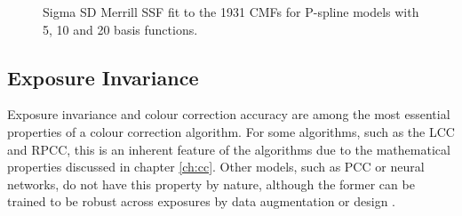\begin{figure}
    \centering
    \caption{Sigma SD Merrill SSF fit to the 1931 CMFs for P-spline models with 5, 10 and 20 basis functions.}
    \label{fig:sigmafit}
\end{figure}

\subsection{Exposure Invariance}

Exposure invariance and colour correction accuracy are among the most essential properties of a colour correction algorithm. For some algorithms, such as the LCC and RPCC, this is an inherent feature of the algorithms due to the mathematical properties discussed in chapter \ref{ch:cc}. Other models, such as PCC or neural networks, do not have this property by nature, although the former can be trained to be robust across exposures by data augmentation or design \cite{kucuk2022exposure}.

